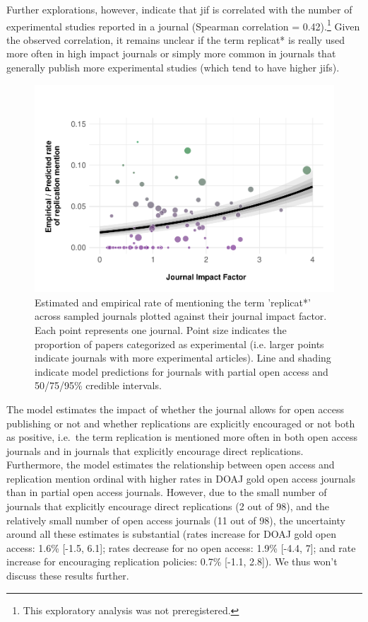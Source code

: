 \documentclass[cm,linguex]{glossa}
\begin{document}
Further explorations, however, indicate that jif is correlated with the number of experimental studies reported in a journal (Spearman correlation = 0.42).\footnote{This exploratory analysis was not preregistered.}
Given the observed correlation, it remains unclear if the term replicat* is really used more often in high impact journals or simply more common in journals that generally publish more experimental studies (which tend to have higher jifs).

\begin{figure}

{\centering \includegraphics[width=1\linewidth]{AnonymizedReplicationLing_files/figure-latex/plot-mention-jif-1} 

}

\caption{Estimated and empirical rate of mentioning the term 'replicat*' across sampled journals plotted against their journal impact factor. Each point represents one journal. Point size indicates the proportion of papers categorized as experimental (i.e. larger points indicate journals with more experimental articles). Line and shading indicate model predictions for journals with partial open access and 50/75/95\% credible intervals.}\label{fig:plot-mention-jif}
\end{figure}

The model estimates the impact of whether the journal allows for open access publishing or not and whether replications are explicitly encouraged or not both as positive, i.e.~the term replication is mentioned more often in both open access journals and in journals that explicitly encourage direct replications. Furthermore, the model estimates the relationship between open access and replication mention ordinal with higher rates in DOAJ gold open access journals than in partial open access journals. However, due to the small number of journals that explicitly encourage direct replications (2 out of 98), and the relatively small number of open access journals (11 out of 98), the uncertainty around all these estimates is substantial (rates increase for DOAJ gold open access: 1.6\% {[}-1.5, 6.1{]}; rates decrease for no open access: 1.9\% {[}-4.4, 7{]}; and rate increase for encouraging replication policies: 0.7\% {[}-1.1, 2.8{]}). We thus won't discuss these results further.
\end{document}
